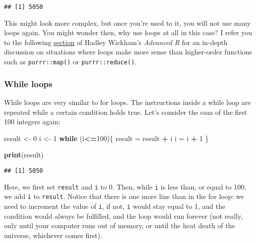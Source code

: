 \documentclass[
]{article}
\newenvironment{Shaded}{\begin{snugshade}}{\end{snugshade}}
\newcommand{\ControlFlowTok}[1]{\textcolor[rgb]{0.13,0.29,0.53}{\textbf{#1}}}
\newcommand{\DecValTok}[1]{\textcolor[rgb]{0.00,0.00,0.81}{#1}}
\newcommand{\KeywordTok}[1]{\textcolor[rgb]{0.13,0.29,0.53}{\textbf{#1}}}
\newcommand{\NormalTok}[1]{#1}
\newcommand{\OperatorTok}[1]{\textcolor[rgb]{0.81,0.36,0.00}{\textbf{#1}}}
\newcommand{\StringTok}[1]{\textcolor[rgb]{0.31,0.60,0.02}{#1}}
\begin{document}
\begin{verbatim}
## [1] 5050
\end{verbatim}

This might look more complex, but once you're used to it, you will not use many loops again.
You might wonder then, why use loops at all in this case? I refer you to the following
\href{http://adv-r.had.co.nz/Functionals.html\#functionals-not}{section} of Hadley Wickham's \emph{Advanced R}
for an in-depth discussion on situations where loops make more sense than higher-order functions
such as \texttt{purrr::map()} or \texttt{purrr::reduce()}.

\hypertarget{while-loops}{%
\subsubsection{While loops}\label{while-loops}}

While loops are very similar to for loops. The instructions inside a while loop are repeated while a
certain condition holds true. Let's consider the sum of the first 100 integers again:

\begin{Shaded}
\begin{Highlighting}[]
\NormalTok{result \textless{}{-}}\StringTok{ }\DecValTok{0}
\NormalTok{i \textless{}{-}}\StringTok{ }\DecValTok{1}
\ControlFlowTok{while}\NormalTok{ (i}\OperatorTok{\textless{}=}\DecValTok{100}\NormalTok{)\{}
\NormalTok{  result =}\StringTok{ }\NormalTok{result }\OperatorTok{+}\StringTok{ }\NormalTok{i}
\NormalTok{  i =}\StringTok{ }\NormalTok{i }\OperatorTok{+}\StringTok{ }\DecValTok{1}
\NormalTok{\}}

\KeywordTok{print}\NormalTok{(result)}
\end{Highlighting}
\end{Shaded}

\begin{verbatim}
## [1] 5050
\end{verbatim}

Here, we first set \texttt{result} and \texttt{i} to 0. Then, while \texttt{i} is less than, or equal to 100, we add \texttt{i}
to \texttt{result}. Notice that there is one more line than in the for loop: we need to increment the value
of \texttt{i}, if not, \texttt{i} would stay equal to 1, and the condition would always be fulfilled, and
the loop would run forever (not really, only until your computer runs out of memory, or until the
heat death of the universe, whichever comes first).
\end{document}
